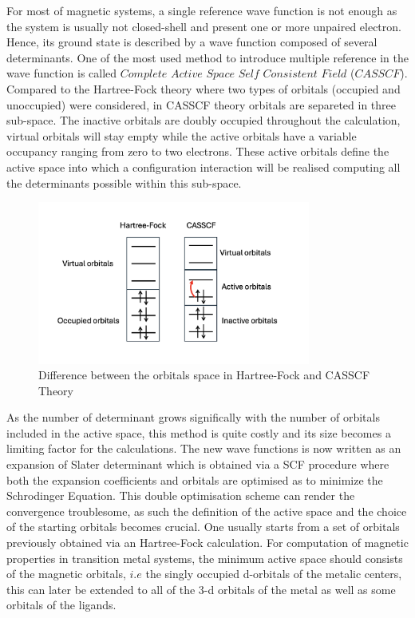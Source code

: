 \documentclass[10pt]{report}
\numberwithin{equation}{section}
\begin{document}
For most of magnetic systems, a single reference wave function is not enough as the system is usually not closed-shell and present one or more unpaired electron. Hence, its ground state is described by a wave function composed of several determinants.
One of the most used method to introduce multiple reference in the wave function is called $Complete$ $Active$ $Space$ $Self$ $Consistent$ $Field$ ($CASSCF$). 
Compared to the Hartree-Fock theory where two types of orbitals (occupied and unoccupied) were considered, in CASSCF theory orbitals are separeted in three sub-space. The inactive orbitals are doubly occupied throughout the calculation, virtual orbitals will stay empty while the active orbitals have a variable occupancy ranging from zero to two electrons.
These active orbitals define the active space into which a configuration interaction will be realised computing all the determinants possible within this sub-space. 
\begin{figure}
    \centering
    \includegraphics[width=0.8\textwidth]{Images/EspaceCAS.png}
    \caption{Difference between the orbitals space in Hartree-Fock and CASSCF Theory}
    \label{CAS}
\end{figure}
As the number of determinant grows significally with the number of orbitals included in the active space, this method is quite costly and its size becomes a limiting factor for the calculations.
The new wave functions is now written as an expansion of Slater determinant which is obtained via a SCF procedure where both the expansion coefficients and orbitals are optimised as to minimize the Schrodinger Equation. 
This double optimisation scheme can render the convergence troublesome, as such the definition of the active space and the choice of the starting orbitals becomes crucial. One usually starts from a set of orbitals previously obtained via an Hartree-Fock calculation.
For computation of magnetic properties in transition metal systems, the minimum active space should consists of the magnetic orbitals, $i.e$ the singly occupied d-orbitals of the metalic centers, this can later be extended to all of the 3-d orbitals of the metal as well as some orbitals of the ligands.
\end{document}

